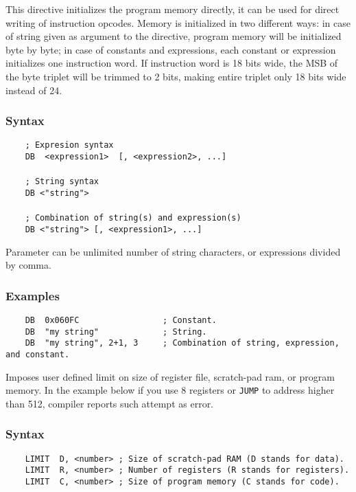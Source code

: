     \clearpage
        This directive initializes the program memory directly, it can be used for direct writing of instruction opcodes. Memory is initialized in two different ways: in case of string given as argument to the directive, program memory will be initialized byte by byte; in case of constants and expressions, each constant or expression initializes one instruction word. If instruction word is 18 bits wide, the MSB of the byte triplet will be trimmed to 2 bits, making entire triplet only 18 bits wide instead of 24.

        \subsubsection{Syntax}
            \verb'    ; Expresion syntax'\\
            \verb'    DB  <expression1>  [, <expression2>, ...]'\\
            \verb''\\
            \verb'    ; String syntax'\\
            \verb'    DB <"string">'\\
            \verb''\\
            \verb'    ; Combination of string(s) and expression(s)'\\
            \verb'    DB <"string"> [, <expression1>, ...]'

            Parameter can be unlimited number of string characters, or expressions divided by comma.


        \subsubsection{Examples}
            \verb'    DB  0x060FC                 ; Constant.'\\
            \verb'    DB  "my string"             ; String.'\\
            \verb'    DB  "my string", 2+1, 3     ; Combination of string, expression, and constant.'

        Imposes user defined limit on size of register file, scratch-pad ram, or program memory. In the example below if you use 8 registers or \texttt{JUMP} to address higher than 512, compiler reports such attempt as error.

        \subsubsection{Syntax}
            \verb'    LIMIT  D, <number> ; Size of scratch-pad RAM (D stands for data).'\\
            \verb'    LIMIT  R, <number> ; Number of registers (R stands for registers).'\\
            \verb'    LIMIT  C, <number> ; Size of program memory (C stands for code).'

